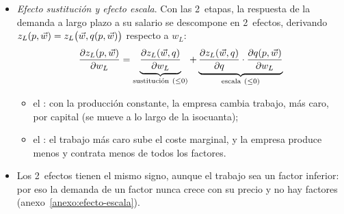 \documentclass[11pt]{article}
\begin{document}
\begin{itemize}
\item \emph{Efecto sustitución y efecto escala}. Con las 2~etapas, la respuesta de la demanda a largo plazo a su salario se descompone en 2~efectos, derivando $z_L(p,\vec{w})=z_L\big(\vec{w},q(p,\vec{w})\big)$ respecto a $w_L$:
  \begin{equation}
  \frac{\partial z_L(p,\vec{w})}{\partial w_L}=\underbrace{\frac{\partial z_L(\vec{w},q)}{\partial w_L}}_{\text{sustitución}\ (\leq 0)}+\underbrace{\frac{\partial z_L(\vec{w},q)}{\partial q}\cdot\frac{\partial q(p,\vec{w})}{\partial w_L}}_{\text{escala}\ (\leq 0)}\label{eq:sustitucion-escala}
  \end{equation}
  \begin{itemize}
  \item el : con la producción constante, la empresa cambia trabajo, más caro, por capital (se mueve a lo largo de la isocuanta);
  \item el : el trabajo más caro sube el coste marginal, y la empresa produce menos y contrata menos de todos los factores.
  \end{itemize}
\item Los 2~efectos tienen el mismo signo, aunque el trabajo sea un factor inferior: por eso la demanda de un factor nunca crece con su precio y no hay factores  (anexo~\ref{anexo:efecto-escala}).
\end{itemize}
\end{document}
